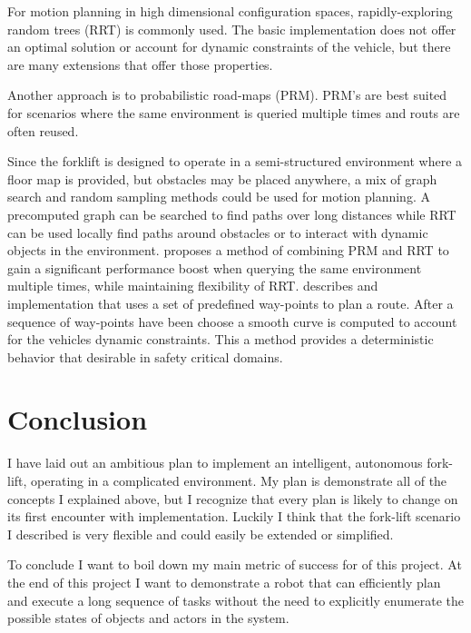 \documentclass[letterpaper, 10 pt, conference]{ieeeconf}  %
\begin{document}
For motion planning in high dimensional configuration spaces, rapidly-exploring random trees (RRT) is commonly used. The basic implementation does not offer an optimal solution or account for dynamic constraints of the vehicle, but there are many extensions that offer those properties.

Another approach is to probabilistic road-maps (PRM). PRM's are best suited for scenarios where the same environment is queried multiple times and routs are often reused.

Since the forklift is designed to operate in a semi-structured environment where a floor map is provided, but obstacles may be placed anywhere, a mix of graph search and random sampling methods could be used for motion planning. A precomputed graph can be searched to find paths over long distances while RRT can be used locally find paths around obstacles or to interact with dynamic objects in the environment. \cite{prm_rrt} proposes a method of combining PRM and RRT to gain a significant performance boost when querying the same environment multiple times, while maintaining flexibility of RRT.
\cite{hentschel07} describes and implementation that uses a set of predefined way-points to plan a route. After a sequence of way-points have been choose a smooth curve is computed to account for the vehicles dynamic constraints. This a method provides a deterministic behavior that desirable in safety critical domains.

\section{Conclusion}

I have laid out an ambitious plan to implement an intelligent, autonomous fork-lift, operating in a complicated environment. My plan is demonstrate all of the concepts I explained above, but I  recognize that every plan is likely to change on its first encounter with implementation. Luckily I think that the fork-lift scenario I described is very flexible and could easily be extended or simplified.

To conclude I want to boil down my main metric of success for of this project. At the end of this project I want to demonstrate a robot that can efficiently plan and execute a long sequence of tasks without the need to explicitly enumerate the possible states of objects and actors in the system.



\addtolength{\textheight}{-10cm}   %





\end{document}
